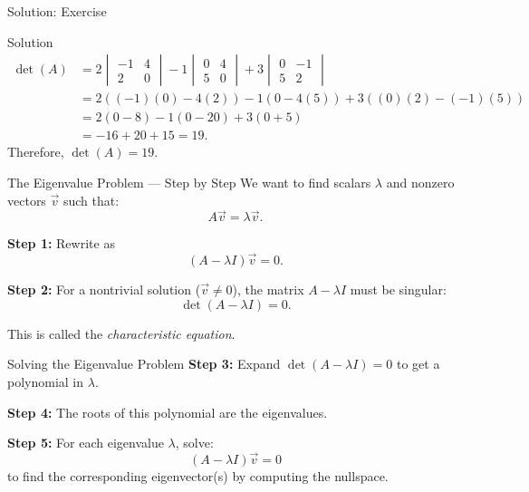\documentclass{beamer}
\begin{document}
	\begin{frame}{Solution: Exercise}
		\begin{block}{Solution}
			\begin{align}
			\det(A) &=
			2 
			\begin{vmatrix} 
			-1 & 4 \\ 2 & 0 
			\end{vmatrix}
			- 1 
			\begin{vmatrix} 
			0 & 4 \\ 5 & 0 
			\end{vmatrix}
			+ 3 
			\begin{vmatrix} 
			0 & -1 \\ 5 & 2 
			\end{vmatrix} \\
			&= 2((-1)(0) -4(2)) -1(0 -4(5)) +3((0)(2) -(-1)(5)) \\
			&= 2(0-8) -1(0-20) +3(0+5) \\
			&= -16 +20 +15 = 19.
			\end{align}
		Therefore, \(\det(A) = 19.\)
		\end{block}
	\end{frame}

	\begin{frame}{The Eigenvalue Problem — Step by Step}
	We want to find scalars \(\lambda\) and nonzero vectors \(\vec{v}\) such that:
		\begin{equation}
		A \vec{v} = \lambda \vec{v}.
		\end{equation}
	
	\textbf{Step 1:} Rewrite as
		\begin{equation}
		(A - \lambda I)\vec{v} = 0.
		\end{equation}
	
	\textbf{Step 2:} For a nontrivial solution (\(\vec{v} \neq 0\)), the matrix \(A - \lambda I\) must be singular:
		\begin{equation}
		\det(A - \lambda I) = 0.
		\end{equation}
	
	This is called the \emph{characteristic equation}.
	\end{frame}

	\begin{frame}{Solving the Eigenvalue Problem}
	\textbf{Step 3:} Expand \(\det(A - \lambda I) = 0\) to get a polynomial in \(\lambda\).
	
	\textbf{Step 4:} The roots of this polynomial are the eigenvalues.
	
	\textbf{Step 5:} For each eigenvalue \(\lambda\), solve:
		\begin{equation}
		(A - \lambda I)\vec{v} = 0
		\end{equation}
	to find the corresponding eigenvector(s) by computing the nullspace.
	\end{frame}
\end{document}
